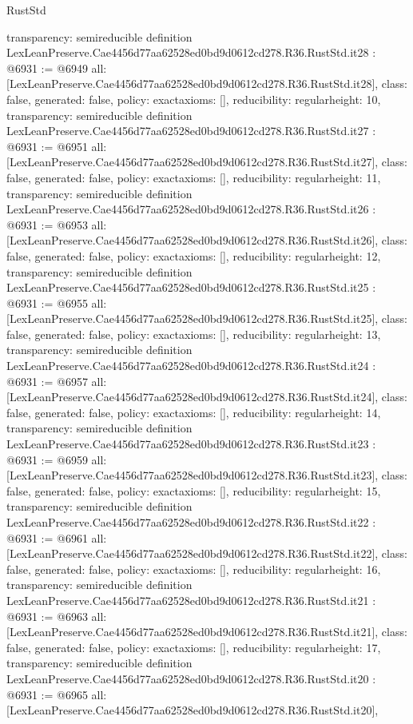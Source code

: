 \begin{lexlean}{RustStd}
\begin{coremodule}
{  transparency: semireducible
}
definition LexLeanPreserve.Cae4456d77aa62528ed0bd9d0612cd278.R36.RustStd.it28 : @6931 := @6949 {
  all: [LexLeanPreserve.Cae4456d77aa62528ed0bd9d0612cd278.R36.RustStd.it28],
  class: false,
  generated: false,
  policy: exact{axioms: []},
  reducibility: regular{height: 10},
  transparency: semireducible
}
definition LexLeanPreserve.Cae4456d77aa62528ed0bd9d0612cd278.R36.RustStd.it27 : @6931 := @6951 {
  all: [LexLeanPreserve.Cae4456d77aa62528ed0bd9d0612cd278.R36.RustStd.it27],
  class: false,
  generated: false,
  policy: exact{axioms: []},
  reducibility: regular{height: 11},
  transparency: semireducible
}
definition LexLeanPreserve.Cae4456d77aa62528ed0bd9d0612cd278.R36.RustStd.it26 : @6931 := @6953 {
  all: [LexLeanPreserve.Cae4456d77aa62528ed0bd9d0612cd278.R36.RustStd.it26],
  class: false,
  generated: false,
  policy: exact{axioms: []},
  reducibility: regular{height: 12},
  transparency: semireducible
}
definition LexLeanPreserve.Cae4456d77aa62528ed0bd9d0612cd278.R36.RustStd.it25 : @6931 := @6955 {
  all: [LexLeanPreserve.Cae4456d77aa62528ed0bd9d0612cd278.R36.RustStd.it25],
  class: false,
  generated: false,
  policy: exact{axioms: []},
  reducibility: regular{height: 13},
  transparency: semireducible
}
definition LexLeanPreserve.Cae4456d77aa62528ed0bd9d0612cd278.R36.RustStd.it24 : @6931 := @6957 {
  all: [LexLeanPreserve.Cae4456d77aa62528ed0bd9d0612cd278.R36.RustStd.it24],
  class: false,
  generated: false,
  policy: exact{axioms: []},
  reducibility: regular{height: 14},
  transparency: semireducible
}
definition LexLeanPreserve.Cae4456d77aa62528ed0bd9d0612cd278.R36.RustStd.it23 : @6931 := @6959 {
  all: [LexLeanPreserve.Cae4456d77aa62528ed0bd9d0612cd278.R36.RustStd.it23],
  class: false,
  generated: false,
  policy: exact{axioms: []},
  reducibility: regular{height: 15},
  transparency: semireducible
}
definition LexLeanPreserve.Cae4456d77aa62528ed0bd9d0612cd278.R36.RustStd.it22 : @6931 := @6961 {
  all: [LexLeanPreserve.Cae4456d77aa62528ed0bd9d0612cd278.R36.RustStd.it22],
  class: false,
  generated: false,
  policy: exact{axioms: []},
  reducibility: regular{height: 16},
  transparency: semireducible
}
definition LexLeanPreserve.Cae4456d77aa62528ed0bd9d0612cd278.R36.RustStd.it21 : @6931 := @6963 {
  all: [LexLeanPreserve.Cae4456d77aa62528ed0bd9d0612cd278.R36.RustStd.it21],
  class: false,
  generated: false,
  policy: exact{axioms: []},
  reducibility: regular{height: 17},
  transparency: semireducible
}
definition LexLeanPreserve.Cae4456d77aa62528ed0bd9d0612cd278.R36.RustStd.it20 : @6931 := @6965 {
  all: [LexLeanPreserve.Cae4456d77aa62528ed0bd9d0612cd278.R36.RustStd.it20],
}
\end{coremodule}
\end{lexlean}

